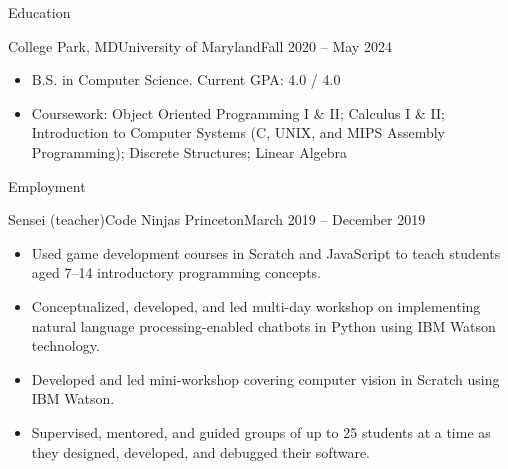 \documentclass[]{mcdowellcv}
\begin{document}
	\begin{cvsection}{Education}
		\begin{cvsubsection}{College Park, MD}{University of Maryland}{Fall 2020 -- May 2024}
			\begin{itemize}
				\item B.S. in Computer Science. Current GPA: 4.0 / 4.0
				\item Coursework: Object Oriented Programming I \& II; Calculus I \& II; Introduction to Computer Systems (C, UNIX, and MIPS Assembly Programming); Discrete Structures; Linear Algebra
			\end{itemize}
		\end{cvsubsection}
	\end{cvsection}

	\begin{cvsection}{Employment}
		\begin{cvsubsection}{Sensei (teacher)}{Code Ninjas Princeton}{March 2019 -- December 2019}
			\begin{itemize}
				\item Used game development courses in Scratch and JavaScript to 
				teach students aged 7--14 introductory programming concepts.
				\item Conceptualized, developed, and led multi-day workshop on implementing natural language 
				processing-enabled chatbots in Python using IBM Watson technology.
				\item Developed and led mini-workshop covering computer vision in Scratch using IBM Watson.
				\item Supervised, mentored, and guided groups of up to 25 students at a time as they designed,
				developed, and debugged their software.
			\end{itemize}
		\end{cvsubsection}
	\end{cvsection}
\end{document}
